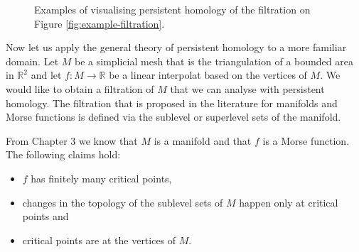 \begin{figure}[h]
    \caption{Examples of visualising persistent homology of the filtration on Figure \ref{fig:example-filtration}.}%
    \label{fig:ph-viz}%
\end{figure}


Now let us apply the general theory of persistent homology to a more familiar domain. Let $M$ be a simplicial mesh that is the triangulation of a bounded area in $\mathbb{R}^2$ and let $f: M \to \mathbb{R}$ be a linear interpolat based on the vertices of $M$. We would like to obtain a filtration of $M$ that we can analyse with persistent homology. The filtration that is proposed in the literature \cite[p. 161]{comp-topo} for manifolds and Morse functions is defined via the sublevel or superlevel sets of the manifold.

From Chapter 3 we know that $M$ is a manifold and that $f$ is a Morse function. The following claims hold:

\begin{itemize}
    \item $f$ has finitely many critical points,
    \item changes in the topology of the sublevel sets of $M$ happen only at critical points and
    \item critical points are at the vertices of $M$.
\end{itemize}

